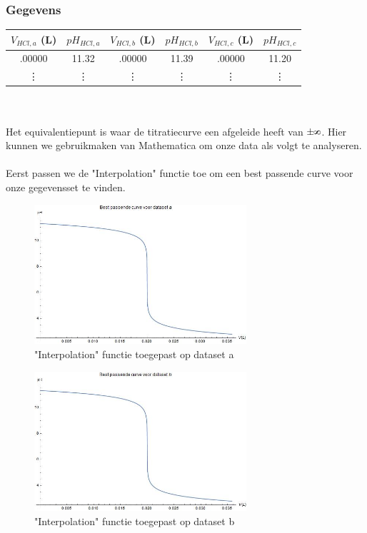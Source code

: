 \documentclass[10pt,twoside]{report}
\def\infinity{\rotatebox{90}{8}}
\begin{document}
\subsubsection{Gegevens}
\begin{tabular}{|c|c||c|c||c|c|}
    \hline
    $V_{HCl,a}$ (L) & $pH_{HCl,a}$ & $V_{HCl,b}$ (L) & $pH_{HCl,b}$ & $V_{HCl,c}$ (L) & $pH_{HCl,c}$ \\\hline
    .00000 & 11.32 & .00000 & 11.39 & .00000 & 11.20\\\hline
    \vdots & \vdots & \vdots & \vdots & \vdots & \vdots \\\hline
\end{tabular}\\\\
Het equivalentiepunt is waar de titratiecurve een afgeleide heeft van $\pm\infinity$. Hier kunnen we gebruikmaken van Mathematica om onze data als volgt te analyseren.\\\\
Eerst passen we de "Interpolation" functie toe om een best passende curve voor onze gegevensset te vinden.
\begin{figure}[H]
    \centering
    \includegraphics[width=0.7\textwidth]{a_interpolation.jpg}
    \caption{"Interpolation" functie toegepast op dataset a}
\end{figure}
\begin{figure}[H]
    \centering
    \includegraphics[width=0.7\textwidth]{b_interpolation.jpg}
    \caption{"Interpolation" functie toegepast op dataset b}
\end{figure}
\end{document}
